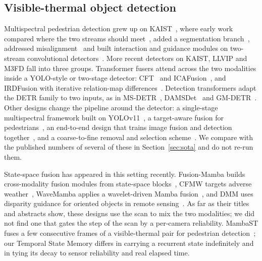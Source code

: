 \subsection{Visible-thermal object detection}
Multispectral pedestrian detection grew up on KAIST~\cite{hwang2015kaist}, where early work compared where the two streams should meet~\cite{liu2016halfway}, added a segmentation branch~\cite{li2018msdsrcnn}, addressed misalignment~\cite{zhang2019arcnn} and built interaction and guidance modules on two-stream convolutional detectors~\cite{zhang2019cian,zhang2021gaff,cao2023csaa}. More recent detectors on KAIST, LLVIP and M3FD fall into three groups. Transformer fusers attend across the two modalities inside a YOLO-style or two-stage detector: CFT~\cite{fang2021cft} and ICAFusion~\cite{shen2024icafusion}, and IRDFusion with iterative relation-map differences~\cite{shen2025irdfusion}. Detection transformers adapt the DETR family to two inputs, as in MS-DETR~\cite{xing2024msdetr}, DAMSDet~\cite{guo2024damsdet} and GM-DETR~\cite{xiao2024gmdetr}. Other designs change the pipeline around the detector: a single-stage multispectral framework built on YOLOv11~\cite{wan2025yolov11rgbt}, a target-aware fusion for pedestrians~\cite{zhang2024tfdet}, an end-to-end design that trains image fusion and detection together~\cite{zhang2024e2emfd}, and a coarse-to-fine removal and selection scheme~\cite{zhao2026rsdet}. We compare with the published numbers of several of these in Section~\ref{sec:sota} and do not re-run them.

State-space fusion has appeared in this setting recently. Fusion-Mamba builds cross-modality fusion modules from state-space blocks~\cite{dong2025fusionmamba}, CFMW targets adverse weather~\cite{li2025cfmw}, WaveMamba applies a wavelet-driven Mamba fusion~\cite{zhu2025wavemamba}, and DMM uses disparity guidance for oriented objects in remote sensing~\cite{zhou2024dmm}. As far as their titles and abstracts show, these designs use the scan to mix the two modalities; we did not find one that gates the step of the scan by a per-camera reliability. MambaST fuses a few consecutive frames of a visible-thermal pair for pedestrian detection~\cite{mambast2024}; our Temporal State Memory differs in carrying a recurrent state indefinitely and in tying its decay to sensor reliability and real elapsed time.

